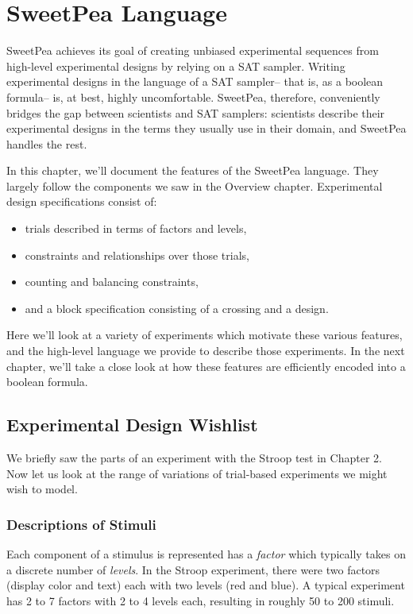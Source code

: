 
\chapter{SweetPea Language}

SweetPea achieves its goal of creating unbiased experimental sequences from high-level experimental designs by relying on a SAT sampler. Writing experimental designs in the language of a SAT sampler-- that is, as a boolean formula-- is, at best, highly uncomfortable. SweetPea, therefore, conveniently bridges the gap between scientists and SAT samplers: scientists describe their experimental designs in the terms they usually use in their domain, and SweetPea handles the rest.

In this chapter, we'll document the features of the SweetPea language. They largely follow the components we saw in the Overview chapter. Experimental design specifications consist of:
\begin{itemize}
  \item trials described in terms of factors and levels,
  \item constraints and relationships over those trials,
  \item counting and balancing constraints,
  \item and a block specification consisting of a crossing and a design.
\end{itemize}

Here we'll look at a variety of experiments which motivate these various features, and the high-level language we provide to describe those experiments. In the next chapter, we'll take a close look at how these features are efficiently encoded into a boolean formula.


\section{Experimental Design Wishlist}

We briefly saw the parts of an experiment with the Stroop test in Chapter 2. Now let us look at the range of variations of trial-based experiments we might wish to model.

\subsection{Descriptions of Stimuli}

Each component of a stimulus is represented has a \emph{factor} which typically takes on a discrete number of \emph{levels}. In the Stroop experiment, there were two factors (display color and text) each with two levels (red and blue). A typical experiment has 2 to 7 factors with 2 to 4 levels each, resulting in roughly 50 to 200 stimuli.

